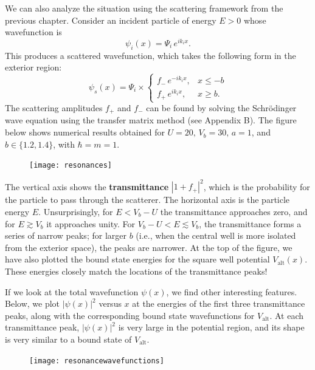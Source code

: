 \documentclass[pra,12pt]{revtex4}
\begin{document}
We can also analyze the situation using the scattering framework from
the previous chapter.  Consider an incident particle of energy $E > 0$
whose wavefunction is
\begin{equation}
  \psi_i(x) = \Psi_i \, e^{ik_i x}.
\end{equation}
This produces a scattered wavefunction, which takes the following form
in the exterior region:
\begin{equation}
  \psi_s(x) = \Psi_i \times \begin{cases}f_- \,e^{-ik_ix}, & x \le -b \\ f_+ \,e^{ik_ix}, & x \ge b.\end{cases}
\end{equation}
The scattering amplitudes $f_+$ and $f_-$ can be found by solving the
Schr\"odinger wave equation using the transfer matrix method (see
Appendix B).  The figure below shows numerical results obtained for $U
= 20,\,V_b = 30,\,a=1$, and $b \in \{ 1.2, 1.4\}$, with $\hbar = m =
1$.

\begin{figure}[h]
  \centering\texttt{[image: resonances]}
\end{figure}

The vertical axis shows the \textbf{transmittance} $|1+f_+|^2$, which
is the probability for the particle to pass through the scatterer.
The horizontal axis is the particle energy $E$.  Unsurprisingly, for
$E < V_b-U$ the transmittance approaches zero, and for $E \gtrsim V_b$
it approaches unity.  For $V_b-U < E \lesssim V_b$, the transmittance
forms a series of narrow peaks; for larger $b$ (i.e., when the central
well is more isolated from the exterior space), the peaks are
narrower.  At the top of the figure, we have also plotted the bound
state energies for the square well potential $V_{\mathrm{alt}}(x)$.
These energies closely match the locations of the transmittance peaks!

If we look at the total wavefunction $\psi(x)$, we find other
interesting features.  Below, we plot $|\psi(x)|^2$ versus $x$ at the
energies of the first three transmittance peaks, along with the
corresponding bound state wavefunctions for $V_{\mathrm{alt}}$.  At
each transmittance peak, $|\psi(x)|^2$ is very large in the potential
region, and its shape is very similar to a bound state of
$V_{\mathrm{alt}}$.

\begin{figure}[h]
  \centering\texttt{[image: resonancewavefunctions]}
\end{figure}
\end{document}
